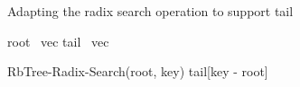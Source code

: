 \begin{listing}[ht!]
    \caption{Adapting the radix search operation to support tail}
    \label{lst:pvec-radix-search}

    \begin{algorithmic}

        \State root \la\ vec
        \State tail \la\ vec

            \State \Return RbTree-Radix-Search(root, key)
        \Else
            \State \Return tail[key - root]
        \EndIf
        \EndFunction
    \end{algorithmic}
\end{listing}
